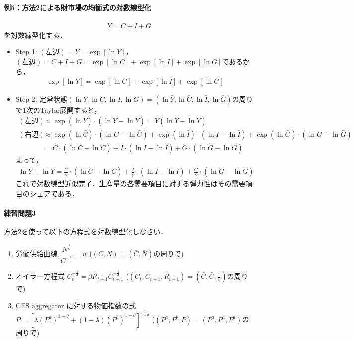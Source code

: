 \documentclass[a4paper,12pt,onecolumn,oneside,notitlepage,final]{article}
\begin{document}
\paragraph{例5：方法2による財市場の均衡式の対数線型化}
\begin{align*}
Y = C + I + G
\end{align*}
を対数線型化する．
\begin{itemize}
\item Step 1: $(\text{左辺}) = Y = \exp[\ln Y]$，$(\text{左辺}) = C + I + G = \exp[\ln C] + \exp[\ln I] + \exp[\ln G]$であるから，
\begin{align*}
\exp[\ln Y] = \exp[\ln C] + \exp[\ln I] + \exp[\ln G]
\end{align*}
\item Step 2: 定常状態$(\ln Y, \ln C, \ln I, \ln G) = (\ln \bar Y, \ln \bar C, \ln \bar I, \ln \bar G)$の周りで1次のTaylor展開すると，
\begin{align*}
(\text{左辺}) &\approx \exp(\ln \bar Y) \cdot (\ln Y - \ln \bar Y) = \bar Y (\ln Y - \ln \bar Y)\\
(\text{右辺}) &\approx \exp(\ln \bar C) \cdot (\ln C - \ln \bar C) + \exp(\ln \bar I) \cdot (\ln I - \ln \bar I) + \exp(\ln \bar G) \cdot (\ln G - \ln \bar G)\\
&= \bar C \cdot (\ln C - \ln \bar C) + \bar I \cdot (\ln I - \ln \bar I) + \bar G \cdot (\ln G - \ln \bar G)
\end{align*}
よって，
\begin{align*}
\ln Y - \ln \bar Y = \frac{\bar C}{\bar Y} \cdot (\ln C - \ln \bar C) + \frac{\bar I}{\bar Y} \cdot (\ln I - \ln \bar I) + \frac{\bar G}{\bar Y} \cdot (\ln G - \ln \bar G)
\end{align*}
これで対数線型近似完了．生産量の各需要項目に対する弾力性はその需要項目のシェアである．
\end{itemize}

\paragraph{練習問題3} 方法2を使って以下の方程式を対数線型化しなさい．
\begin{enumerate}
\item 労働供給曲線 $\dfrac{N^\frac{1}{\phi}}{C^{-\frac{1}{\sigma}}} = w$ \quad ($(C,N) = (\bar C, \bar N)$の周りで)
\item オイラー方程式 $C_t^{-\frac{1}{\sigma}} = \beta R_{t+1} C_{t+1}^{-\frac{1}{\sigma}}$ \quad ($(C_t, C_{t+1}, R_{t+1}) = (\bar C, \bar C, \frac{1}{\beta})$の周りで)
\item CES aggregator に対する物価指数の式 $P = \left[\lambda (P^a)^{1-\theta} + (1-\lambda) (P^b)^{1-\theta}\right]^\frac{1}{1-\theta}$ \quad ($(P^a, P^b, P) = (P^a, P^a, P^a)$の周りで)
\end{enumerate}
\end{document}
